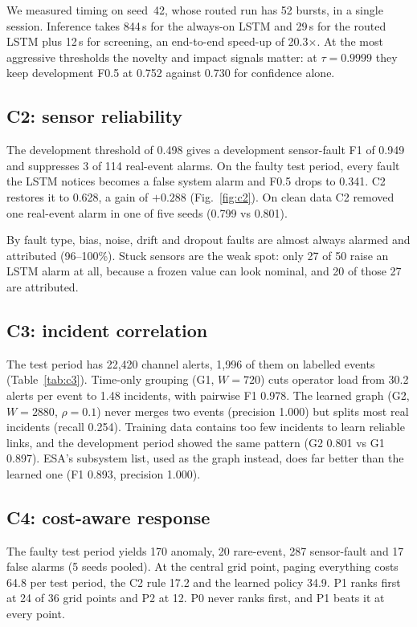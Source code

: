 \documentclass[conference]{IEEEtran}
\begin{document}
We measured timing on seed~42, whose routed run has 52 bursts, in a single session. Inference takes 844\,s for the always-on LSTM and 29\,s for the routed LSTM plus 12\,s for screening, an end-to-end speed-up of 20.3$\times$. At the most aggressive thresholds the novelty and impact signals matter: at $\tau=0.9999$ they keep development F0.5 at 0.752 against 0.730 for confidence alone.

\subsection{C2: sensor reliability}
The development threshold of 0.498 gives a development sensor-fault F1 of 0.949 and suppresses 3 of 114 real-event alarms. On the faulty test period, every fault the LSTM notices becomes a false system alarm and F0.5 drops to 0.341. C2 restores it to 0.628, a gain of $+0.288$ (Fig.~\ref{fig:c2}). On clean data C2 removed one real-event alarm in one of five seeds (0.799 vs 0.801).

By fault type, bias, noise, drift and dropout faults are almost always alarmed and attributed (96--100\%). Stuck sensors are the weak spot: only 27 of 50 raise an LSTM alarm at all, because a frozen value can look nominal, and 20 of those 27 are attributed.

\subsection{C3: incident correlation}
The test period has 22,420 channel alerts, 1,996 of them on labelled events (Table~\ref{tab:c3}). Time-only grouping (G1, $W=720$) cuts operator load from 30.2 alerts per event to 1.48 incidents, with pairwise F1 0.978. The learned graph (G2, $W=2880$, $\rho=0.1$) never merges two events (precision 1.000) but splits most real incidents (recall 0.254). Training data contains too few incidents to learn reliable links, and the development period showed the same pattern (G2 0.801 vs G1 0.897). ESA's subsystem list, used as the graph instead, does far better than the learned one (F1 0.893, precision 1.000).

\subsection{C4: cost-aware response}
The faulty test period yields 170 anomaly, 20 rare-event, 287 sensor-fault and 17 false alarms (5 seeds pooled). At the central grid point, paging everything costs 64.8 per test period, the C2 rule 17.2 and the learned policy 34.9. P1 ranks first at 24 of 36 grid points and P2 at 12. P0 never ranks first, and P1 beats it at every point.
\end{document}
